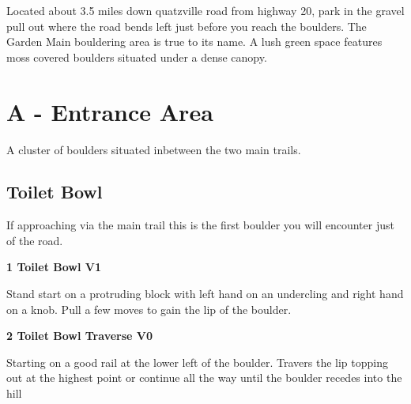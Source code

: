 

\raggedcolumns
\begin{multicols}{2}

Located about 3.5 miles down quatzville road from highway 20, park in the gravel pull out where the road bends left just before you reach the boulders. The Garden Main bouldering area is true to its name. A lush green space features moss covered boulders situated under a dense canopy.\\


\newpage

		\section{A - Entrance Area}\label{sa:Entrance Area}
	A cluster of boulders situated inbetween the two main trails.\\

	
			\subsection*{Toilet Bowl}\label{bf:Toilet Bowl}
			If approaching via the main trail this is the first boulder you will encounter just of the road.\\
			

					\label{rt:Toilet Bowl}
\colorbox{green!20}{
\parbox{0.95\linewidth}{
\textbf{
1 Toilet Bowl V1  
}
}
}

					\begin{adjustwidth}{0.5cm}{}				
					Stand start on a protruding block with left hand on an undercling and right hand on a knob. Pull a few moves to gain the lip of the boulder.
					\end{adjustwidth}
					\label{rt:Toilet Bowl Traverse}
\colorbox{green!20}{
\parbox{0.95\linewidth}{
\textbf{
2 Toilet Bowl Traverse V0  
}
}
}

					\begin{adjustwidth}{0.5cm}{}				
					Starting on a good rail at the lower left of the boulder. Travers the lip topping out at the highest point or continue all the way until the boulder recedes into the hill
					\end{adjustwidth}


\end{multicols}
